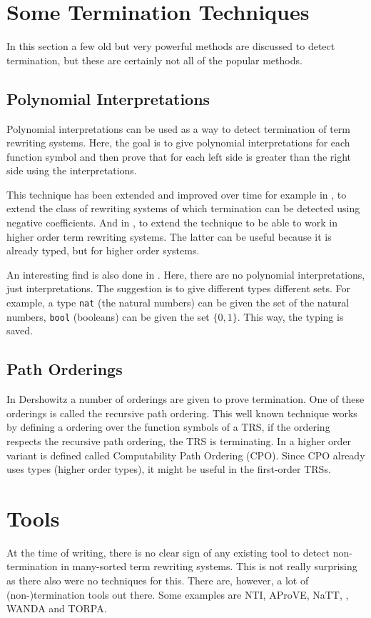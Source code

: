\section{Some Termination Techniques}
In this section a few old but very powerful methods are discussed to detect termination, but these are certainly not all of the popular methods. 

\subsection*{Polynomial Interpretations}
Polynomial interpretations \cite{BENCHERIFA1987137} can be used as a way to detect termination of term rewriting systems. Here, the goal is to give polynomial interpretations for each function symbol and then prove that for each left side is greater than the right side using the interpretations. 

This technique has been extended and improved over time for example in \cite{HIROKAWA:PolyNeg}, to extend the class of rewriting systems of which termination  can be detected using negative coefficients. And in \cite{FUHSKOP:PolyHO}, to extend the technique to be able to work in higher order term rewriting systems. The latter can be useful because it is already typed, but for higher order systems. 

An interesting find is also done in \cite{Pol}. Here, there are no polynomial interpretations, just interpretations. The suggestion is to give different types different sets. For example, a type \texttt{nat} (the natural numbers) can be given the set of the natural numbers, \texttt{bool} (booleans) can be given the set $\{ 0, 1 \}$. This way, the typing is saved.

\subsection*{Path Orderings}
In Dershowitz \cite{DERSHOWITZ1982279} a number of orderings are given to prove termination. One of these orderings is called the recursive path ordering. This well known technique works by defining a ordering over the function symbols of a TRS, if the ordering respects the recursive path ordering, the TRS is terminating. In \cite{CPO} a higher order variant is defined called Computability Path Ordering (CPO). Since CPO already uses types (higher order types), it might be useful in the first-order TRSs. 

\section{Tools}
At the time of writing, there is no clear sign of any existing tool to detect non-termination in many-sorted term rewriting systems. This is not really surprising as there also were no techniques for this. There are, however, a lot of (non-)termination tools out there. Some examples are NTI, AProVE, NaTT, \TTTT, WANDA and TORPA.

